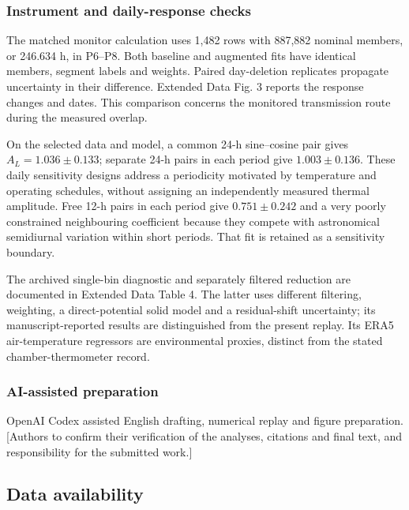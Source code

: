 \documentclass[
  12pt,
  a4paper,
]{article}
\begin{document}
\hypertarget{instrument-and-daily-response-checks}{%
\subsubsection{Instrument and daily-response
checks}\label{instrument-and-daily-response-checks}}

The matched monitor calculation uses 1,482 rows with 887,882 nominal
members, or 246.634 h, in P6--P8. Both baseline and augmented fits have
identical members, segment labels and weights. Paired day-deletion
replicates propagate uncertainty in their difference. Extended Data Fig.
3 reports the response changes and dates. This comparison concerns the
monitored transmission route during the measured overlap.

On the selected data and model, a common 24-h sine--cosine pair gives
\(A_L=1.036\pm0.133\); separate 24-h pairs in each period give
\(1.003\pm0.136\). These daily sensitivity designs address a periodicity
motivated by temperature and operating schedules, without assigning an
independently measured thermal amplitude. Free 12-h pairs in each period
give \(0.751\pm0.242\) and a very poorly constrained neighbouring
coefficient because they compete with astronomical semidiurnal variation
within short periods. That fit is retained as a sensitivity boundary.

The archived single-bin diagnostic and separately filtered reduction are
documented in Extended Data Table 4. The latter uses different
filtering, weighting, a direct-potential solid model and a
residual-shift uncertainty; its manuscript-reported results are
distinguished from the present replay. Its ERA5 air-temperature
regressors are environmental proxies, distinct from the stated
chamber-thermometer record.

\hypertarget{ai-assisted-preparation}{%
\subsubsection{AI-assisted preparation}\label{ai-assisted-preparation}}

OpenAI Codex assisted English drafting, numerical replay and figure
preparation. {[}Authors to confirm their verification of the analyses,
citations and final text, and responsibility for the submitted work.{]}

\singlespacing\fontsize{11}{13}\selectfont

\hypertarget{data-availability}{%
\subsection{Data availability}\label{data-availability}}
\end{document}
